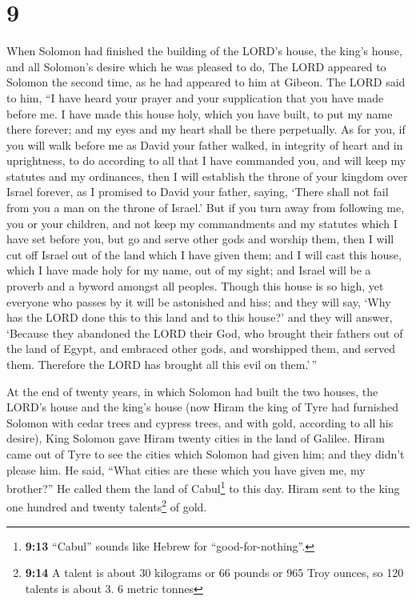 \hypertarget{section-8}{%
\section{9}\label{section-8}}

 When Solomon had finished the building of the LORD's
house, the king's house, and all Solomon's desire which he was pleased
to do,  The LORD appeared to Solomon the second time, as
he had appeared to him at Gibeon.  The LORD said to him,
``I have heard your prayer and your supplication that you have made
before me. I have made this house holy, which you have built, to put my
name there forever; and my eyes and my heart shall be there perpetually.
 As for you, if you will walk before me as David your
father walked, in integrity of heart and in uprightness, to do according
to all that I have commanded you, and will keep my statutes and my
ordinances,  then I will establish the throne of your
kingdom over Israel forever, as I promised to David your father, saying,
`There shall not fail from you a man on the throne of Israel.'
 But if you turn away from following me, you or your
children, and not keep my commandments and my statutes which I have set
before you, but go and serve other gods and worship them, 
then I will cut off Israel out of the land which I have given them; and
I will cast this house, which I have made holy for my name, out of my
sight; and Israel will be a proverb and a byword amongst all peoples.
 Though this house is so high, yet everyone who passes by
it will be astonished and hiss; and they will say, `Why has the LORD
done this to this land and to this house?'  and they will
answer, `Because they abandoned the LORD their God, who brought their
fathers out of the land of Egypt, and embraced other gods, and
worshipped them, and served them. Therefore the LORD has brought all
this evil on them.'\,''

 At the end of twenty years, in which Solomon had built
the two houses, the LORD's house and the king's house 
(now Hiram the king of Tyre had furnished Solomon with cedar trees and
cypress trees, and with gold, according to all his desire), King Solomon
gave Hiram twenty cities in the land of Galilee.  Hiram
came out of Tyre to see the cities which Solomon had given him; and they
didn't please him.  He said, ``What cities are these
which you have given me, my brother?'' He called them the land of
Cabul\footnote{\textbf{9:13} ``Cabul'' sounds like Hebrew for
  ``good-for-nothing''.} to this day.  Hiram sent to the
king one hundred and twenty talents\footnote{\textbf{9:14} A talent is
  about 30 kilograms or 66 pounds or 965 Troy ounces, so 120 talents is
  about 3. 6 metric tonnes} of gold.

